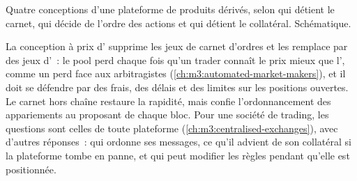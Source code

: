 \begin{omfigure}
\centering
{}

Quatre conceptions d'une plateforme de produits dérivés, selon qui détient le carnet, qui décide de l'ordre des actions et qui détient le collatéral. Schématique.\label{fig:m3:on-chain-order-books-and-perpetual-dexs:designs}
\end{omfigure}

La conception à prix d' supprime les jeux de carnet d'ordres et les remplace par des jeux d'~: le pool perd chaque fois qu'un trader connaît le prix mieux que l', comme
un  perd face aux arbitragistes (\cref{ch:m3:automated-market-makers}), et il doit se défendre par des frais, des délais et des limites sur
les positions ouvertes. Le carnet hors chaîne restaure la rapidité, mais confie l'ordonnancement des appariements au proposant de chaque bloc. Pour une société de trading, les questions sont celles de
toute plateforme (\cref{ch:m3:centralised-exchanges}), avec d'autres réponses~: qui ordonne ses messages, ce qu'il advient de son collatéral si la plateforme tombe en panne, et qui
peut modifier les règles pendant qu'elle est positionnée.

